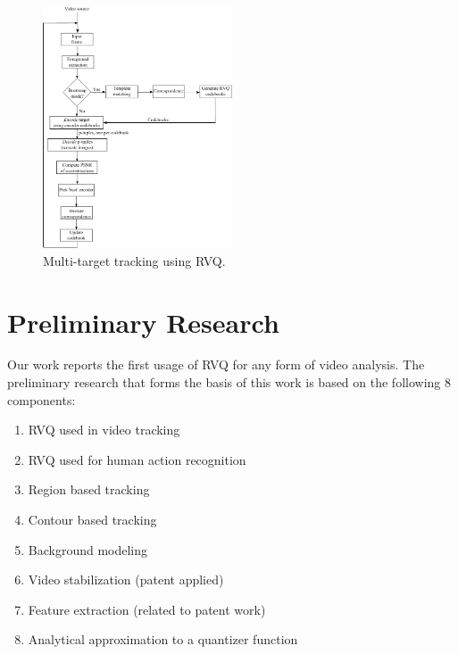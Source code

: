 \documentclass[12pt,letterpaper,doublespaced,ETD,proposal]{gt-ece-thesis}
\begin{document}
\begin{Body}
			\begin{figure}		
					\centering		
					\includegraphics[width=0.5\textwidth]{figs/Proposal_fig2_RVQ_MTT_BlockDiagram}
					\caption{Multi-target tracking using RVQ.}
					\label{fig:MTT_BlockDiagram}
			\end{figure}

\newpage
\section{Preliminary Research}
\label{Sec:Preliminary}
Our work reports the first usage of RVQ for any form of video analysis.  The preliminary research that forms the basis of this work is based on the following 8 components:

\begin{enumerate}
\item RVQ used in video tracking
\item RVQ used for human action recognition
\item Region based tracking
\item Contour based tracking
\item Background modeling
\item Video stabilization (patent applied)
\item Feature extraction (related to patent work)
\item Analytical approximation to a quantizer function 
\end{enumerate}
  

\end{Body}
\end{document}
